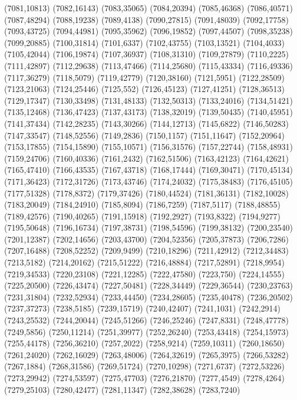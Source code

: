 (7081,10813)
(7082,16143)
(7083,35065)
(7084,20394)
(7085,46368)
(7086,40571)
(7087,48294)
(7088,19238)
(7089,4138)
(7090,27815)
(7091,48039)
(7092,17758)
(7093,43725)
(7094,44981)
(7095,35962)
(7096,19852)
(7097,44507)
(7098,35238)
(7099,20885)
(7100,31814)
(7101,6337)
(7102,43755)
(7103,13521)
(7104,4033)
(7105,42044)
(7106,19874)
(7107,36937)
(7108,31310)
(7109,27879)
(7110,2225)
(7111,42897)
(7112,29638)
(7113,47466)
(7114,25680)
(7115,43334)
(7116,49336)
(7117,36279)
(7118,5079)
(7119,42779)
(7120,38160)
(7121,5951)
(7122,28509)
(7123,21063)
(7124,25446)
(7125,552)
(7126,45123)
(7127,41251)
(7128,36513)
(7129,17347)
(7130,33498)
(7131,48133)
(7132,50313)
(7133,24016)
(7134,51421)
(7135,12468)
(7136,47423)
(7137,43173)
(7138,32019)
(7139,50435)
(7140,45951)
(7141,37434)
(7142,28235)
(7143,30266)
(7144,12713)
(7145,6822)
(7146,50283)
(7147,33547)
(7148,52556)
(7149,2836)
(7150,1157)
(7151,11647)
(7152,20964)
(7153,17855)
(7154,15890)
(7155,10571)
(7156,31576)
(7157,22744)
(7158,48931)
(7159,24706)
(7160,40336)
(7161,2432)
(7162,51506)
(7163,42123)
(7164,42621)
(7165,47410)
(7166,43535)
(7167,43718)
(7168,17444)
(7169,30471)
(7170,45134)
(7171,36423)
(7172,31726)
(7173,43746)
(7174,24032)
(7175,38483)
(7176,45105)
(7177,51328)
(7178,8372)
(7179,37426)
(7180,44524)
(7181,36131)
(7182,10028)
(7183,20049)
(7184,24910)
(7185,8094)
(7186,7259)
(7187,5117)
(7188,48855)
(7189,42576)
(7190,40265)
(7191,15918)
(7192,2927)
(7193,8322)
(7194,9277)
(7195,50648)
(7196,16734)
(7197,38731)
(7198,54596)
(7199,38132)
(7200,23540)
(7201,12387)
(7202,14656)
(7203,43700)
(7204,52356)
(7205,37873)
(7206,7286)
(7207,16488)
(7208,52252)
(7209,9499)
(7210,18296)
(7211,42912)
(7212,34483)
(7213,5182)
(7214,20162)
(7215,51222)
(7216,48884)
(7217,52891)
(7218,9954)
(7219,34533)
(7220,23108)
(7221,12285)
(7222,47580)
(7223,750)
(7224,14555)
(7225,20500)
(7226,43474)
(7227,50481)
(7228,34449)
(7229,36544)
(7230,23763)
(7231,31804)
(7232,52934)
(7233,44450)
(7234,28605)
(7235,40478)
(7236,20502)
(7237,37273)
(7238,5185)
(7239,15719)
(7240,42407)
(7241,1031)
(7242,2914)
(7243,25532)
(7244,20044)
(7245,51266)
(7246,25246)
(7247,8331)
(7248,47778)
(7249,5856)
(7250,11214)
(7251,39977)
(7252,26240)
(7253,43418)
(7254,15973)
(7255,44178)
(7256,36210)
(7257,2022)
(7258,9214)
(7259,10311)
(7260,18650)
(7261,24020)
(7262,16029)
(7263,48006)
(7264,32619)
(7265,3975)
(7266,53282)
(7267,1884)
(7268,31586)
(7269,51724)
(7270,10298)
(7271,6737)
(7272,53226)
(7273,29942)
(7274,53597)
(7275,47703)
(7276,21870)
(7277,4549)
(7278,4264)
(7279,25103)
(7280,42477)
(7281,11347)
(7282,38628)
(7283,7240)

